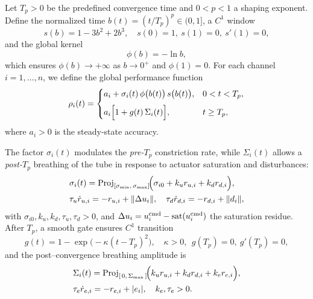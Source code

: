 \documentclass[pdflatex,sn-mathphys-num]{sn-jnl}%
\theoremstyle{thmstyleone}%
\theoremstyle{thmstyletwo}%
\theoremstyle{thmstylethree}%
\begin{document}
Let $T_p>0$ be the predefined convergence time and $0<p<1$ a shaping exponent.
Define the normalized time $b(t)=(t/T_p)^p\in(0,1]$, a $C^1$ window
\begin{equation}\label{eq:gppf-window}
s(b)=1-3b^2+2b^3,\quad s(0)=1,\ s(1)=0,\ s'(1)=0,
\end{equation}
and the global kernel
\begin{equation}\label{eq:gppf-kernel}
\phi(b) = -\ln b,
\end{equation}
which ensures $\phi(b)\to+\infty$ as $b\to0^+$ and $\phi(1)=0$.
For each channel $i=1,\dots,n$, we define the global performance function
\begin{equation}\label{eq:gppf-def}
\rho_i(t)=
\begin{cases}
\displaystyle a_i + \sigma_i(t)\,\phi\bigl(b(t)\bigr)\,s\bigl(b(t)\bigr), & 0<t<T_p,\\[6pt]
\displaystyle a_i\Bigl[1 + g(t)\,\Sigma_i(t)\Bigr], & t\ge T_p,
\end{cases}
\end{equation}
where $a_i>0$ is the steady-state accuracy.

The factor $\sigma_i(t)$ modulates the \emph{pre-$T_p$} constriction rate, while $\Sigma_i(t)$ allows a \emph{post-$T_p$} breathing of the tube in response to actuator saturation and disturbances:
\begin{align}
&\sigma_i(t)=\operatorname{Proj}_{[\sigma_{\min},\,\sigma_{\max}]}\!\Bigl(\sigma_{i0}+k_u r_{u,i}+k_d r_{d,i}\Bigr),\label{eq:gppf-sigma}\\
&\tau_u \dot r_{u,i}=-r_{u,i}+\|\Delta u_i\|,\quad
  \tau_d \dot r_{d,i}=-r_{d,i}+\|d_i\|, \nonumber
\end{align}
with $\sigma_{i0},k_u,k_d,\tau_u,\tau_d>0$, and $\Delta u_i=u^{\rm cmd}_i-\operatorname{sat}(u^{\rm cmd}_i)$ the saturation residue.
After $T_p$, a smooth gate ensures $C^1$ transition
\begin{equation}\label{eq:gppf-gate}
g(t)=1-\exp\!\bigl(-\kappa (t-T_p)^2\bigr),\quad \kappa>0,\ \ g(T_p)=0,\ g'(T_p)=0,
\end{equation}
and the post–convergence breathing amplitude is
\begin{align}
&\Sigma_i(t)=\operatorname{Proj}_{[\,0,\,\Sigma_{\max}\,]}\!\Bigl(k_u r_{u,i}+k_d r_{d,i}+k_e r_{e,i}\Bigr),\label{eq:gppf-Sigma}\\
&\tau_e \dot r_{e,i}=-r_{e,i}+|e_i|, \quad k_e,\tau_e>0.\nonumber
\end{align}
\end{document}
